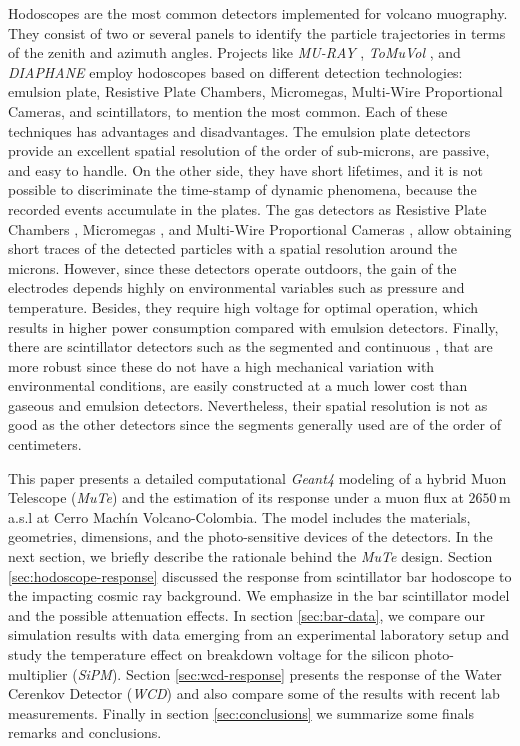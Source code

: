 \documentclass[submitting]{nst}
\begin{document}
Hodoscopes are the most common detectors implemented for volcano muography.  They consist of two or several panels to identify the particle trajectories in terms of the zenith and azimuth angles. Projects like \textsl{MU-RAY} \cite{AnastasioEtal2013}, \textsl{ToMuVol} \cite{CarloganuEtal2013}, and \textsl{DIAPHANE} \cite{LesparreEtal2010} employ hodoscopes based on different detection technologies: emulsion plate, Resistive Plate Chambers, Micromegas, Multi-Wire Proportional Cameras, and scintillators, to mention the most common. Each of these techniques has advantages and disadvantages. The emulsion plate detectors \cite{MorishimaEtal2017, Nagamine2016} provide an excellent spatial resolution of the order of sub-microns, are passive, and easy to handle. On the other side, they have short lifetimes, and it is not possible to discriminate the time-stamp of dynamic phenomena, because the recorded events accumulate in the plates. The gas detectors as Resistive Plate Chambers \cite{SehgalEtal2016, Fehr2012}, Micromegas \cite{BouteilleEtal2016}, and Multi-Wire Proportional Cameras \cite{OlahEtal2018}, allow obtaining short traces of the detected particles with a spatial resolution around the microns. However, since these detectors operate outdoors, the gain of the electrodes depends highly on environmental variables such as pressure and temperature. Besides, they require high voltage for optimal operation, which results in higher power consumption compared with emulsion detectors. Finally, there are scintillator detectors such as the segmented \cite{FujiiEtal2013, LesparreEtal2012, TanakaEtal2009} and continuous \cite{NagamineEtal1995, AguiarEtal2015, TangEtal2016},  that are more robust since these do not have a high mechanical variation with environmental conditions, are easily constructed at a much lower cost than gaseous and emulsion detectors. Nevertheless, their spatial resolution is not as good as the other detectors since the segments generally used are of the order of centimeters.

This paper presents a detailed computational \textsl{Geant4} modeling of a hybrid Muon Telescope (\textsl{MuTe}) and the estimation of its response under a muon flux at $2650$\,m a.s.l at Cerro Machín Volcano-Colombia. The model includes the materials, geometries, dimensions, and the photo-sensitive devices of the detectors. In the next section, we briefly describe the rationale behind the \textsl{MuTe} design. Section \ref{sec:hodoscope-response} discussed the response from scintillator bar hodoscope to the impacting cosmic ray background. We emphasize in the bar scintillator model and the possible attenuation effects. In section \ref{sec:bar-data}, we compare our simulation results with data emerging from an experimental laboratory setup and study the temperature effect on breakdown voltage for the silicon photo-multiplier (\textsl{SiPM}). Section \ref{sec:wcd-response} presents the response of the Water Cerenkov Detector (\textsl{WCD}) and also compare some of the results with recent lab measurements. Finally in section \ref{sec:conclusions} we summarize some finals remarks and conclusions.
\end{document}

